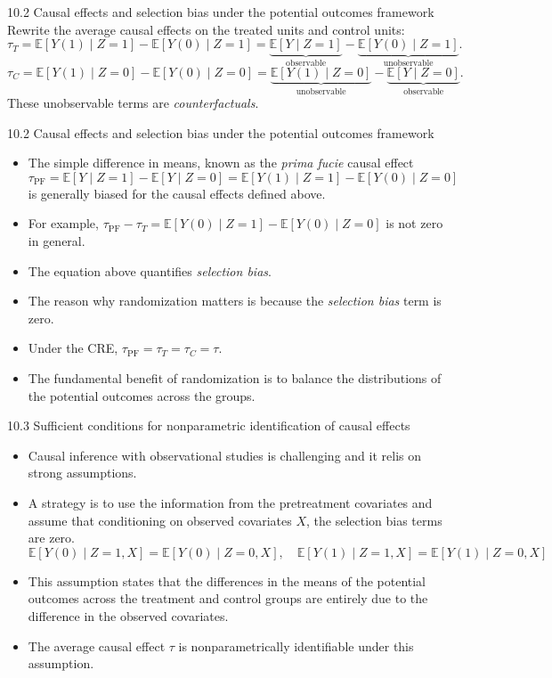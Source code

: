 \documentclass[aspectratio=169, 12pt]{beamer}
\begin{document}
\begin{frame}{10.2 Causal effects and selection bias under the potential outcomes framework}
  Rewrite the average causal effects on the treated units and control units:
  \[
  \tau_T=\mathbb{E}[Y(1)\mid Z=1]-\mathbb{E}[Y(0)\mid Z=1]=\underbrace{\mathbb{E}[Y\mid Z=1]}_{\text{observable}}-\underbrace{\mathbb{E}[Y(0)\mid Z=1]}_{\text{unobservable}}.
  \]
  \[
  \tau_C=\mathbb{E}[Y(1)\mid Z=0]-\mathbb{E}[Y(0)\mid Z=0]=\underbrace{\mathbb{E}[Y(1)\mid Z=0]}_{\text{unobservable}}-\underbrace{\mathbb{E}[Y\mid Z=0]}_{\text{observable}}.
  \]
  These unobservable terms are \textit{counterfactuals}.
\end{frame}


\begin{frame}{10.2 Causal effects and selection bias under the potential outcomes framework}
  \begin{itemize}
    \item The simple difference in means, known as the \textit{prima fucie} causal effect
    \[
    \tau_{\text{PF}}=\mathbb{E}[Y\mid Z=1]-\mathbb{E}[Y\mid Z=0]=\mathbb{E}[Y(1)\mid Z=1]-\mathbb{E}[Y(0)\mid Z=0]
    \]
    is generally biased for the causal effects defined above.
    \item For example, $\tau_{\text{PF}}-\tau_T=\mathbb{E}[Y(0)\mid Z=1]-\mathbb{E}[Y(0)\mid Z=0]$ is not zero in general.
    \item The equation above quantifies \textit{selection bias}.
    \item The reason why randomization matters is because the \textit{selection bias} term is zero.
    \item Under the CRE, $\tau_{\text{PF}}=\tau_T=\tau_C=\tau$.
    \item The fundamental benefit of randomization is to balance the distributions of the potential outcomes across the groups.
  \end{itemize}
\end{frame}


\begin{frame}{10.3 Sufficient conditions for nonparametric identification of causal effects}
  \begin{itemize}
    \item Causal inference with observational studies is challenging and it relis on strong assumptions.
    \item A strategy is to use the information from the pretreatment covariates and assume that conditioning on observed covariates $X$, the selection bias terms are zero.
    {\small\[
    \mathbb{E}[Y(0)\mid Z=1,X]=\mathbb{E}[Y(0)\mid Z=0,X],\quad \mathbb{E}[Y(1)\mid Z=1,X]=\mathbb{E}[Y(1)\mid Z=0,X]
    \]}
    \item This assumption states that the differences in the means of the potential outcomes across the treatment and control groups are entirely due to the difference in the observed covariates.
    \item The average causal effect $\tau$ is nonparametrically identifiable under this assumption.
  \end{itemize}
\end{frame}
\end{document}

